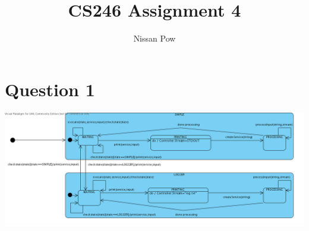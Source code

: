\documentclass{article}[12pt]
\title{CS246 Assignment 4}
\author{Nissan Pow}
\begin{document}
\maketitle

\section*{Question 1}
\includegraphics[scale=0.45]{cs246_a4q1.png}
\end{document}
